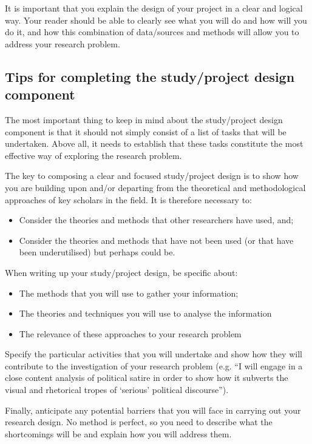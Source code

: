 \documentclass[12pt, a4paper]{article}
\begin{document}
It is important that you explain the design of your project in a clear and logical way. Your reader should be able to clearly see what you will do and how will you do it, and how this combination of data/sources and methods will allow you to address your research problem.

\subsection{Tips for completing the study/project design component}
The most important thing to keep in mind about the study/project design component is that it should not simply consist of a list of tasks that will be undertaken. Above all, it needs to establish that these tasks constitute the most effective way of exploring the research problem.

The key to composing a clear and focused study/project design is to show how you are building upon and/or departing from the theoretical and methodological approaches of key scholars in the field. It is therefore necessary to:
\begin{itemize}
\item Consider the theories and methods that other researchers have used, and;
\item Consider the theories and methods that have not been used (or that have been underutilised) but perhaps could be.
\end{itemize}

When writing up your study/project design, be specific about:
\begin{itemize}
\item The methods that you will use to gather your information;
\item The theories and techniques you will use to analyse the information
\item The relevance of these approaches to your research problem
\end{itemize}

Specify the particular activities that you will undertake and show how they will contribute to the investigation of your research problem (e.g. “I will engage in a close content analysis of political satire in order to show how it subverts the visual and rhetorical tropes of ‘serious’ political discourse”).

Finally, anticipate any potential barriers that you will face in carrying out your research design. No method is perfect, so you need to describe what the shortcomings will be and explain how you will address them.
\end{document}
